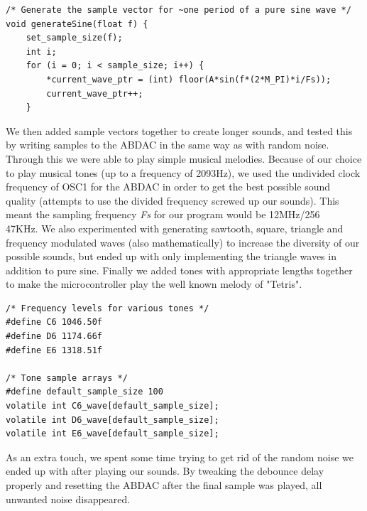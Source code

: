 \documentclass[a4paper,11pt]{article}
\begin{document}
\begin{lstlisting}
/* Generate the sample vector for ~one period of a pure sine wave */
void generateSine(float f) {
	set_sample_size(f);
	int i;
	for (i = 0; i < sample_size; i++) {
		*current_wave_ptr = (int) floor(A*sin(f*(2*M_PI)*i/Fs));
		current_wave_ptr++;
	}
\end{lstlisting}

We then added sample vectors together to create longer sounds, and tested this by writing samples to the ABDAC in the same way as with random noise. Through this we were able to play simple musical melodies. Because of our choice to play musical tones (up to a frequency of 2093Hz), we used the undivided clock frequency of OSC1 for the ABDAC in order to get the best possible sound quality (attempts to use the divided frequency screwed up our sounds). This meant the sampling frequency \textit{Fs} for our program would be 12MHz/256 ~ 47KHz. We also experimented with generating sawtooth, square, triangle and frequency modulated waves (also mathematically) to increase the diversity of our possible sounds, but ended up with only implementing the triangle waves in addition to pure sine. Finally we added tones with appropriate lengths together to make the microcontroller play the well known melody of "Tetris". 

\begin{lstlisting}
/* Frequency levels for various tones */
#define C6 1046.50f
#define D6 1174.66f
#define E6 1318.51f

/* Tone sample arrays */
#define default_sample_size 100
volatile int C6_wave[default_sample_size];
volatile int D6_wave[default_sample_size];
volatile int E6_wave[default_sample_size];
\end{lstlisting}
As an extra touch, we spent some time trying to get rid of the random noise we ended up with after playing our sounds. By tweaking the debounce delay properly and resetting the ABDAC after the final sample was played, all unwanted noise disappeared.

\newpage
\end{document}
